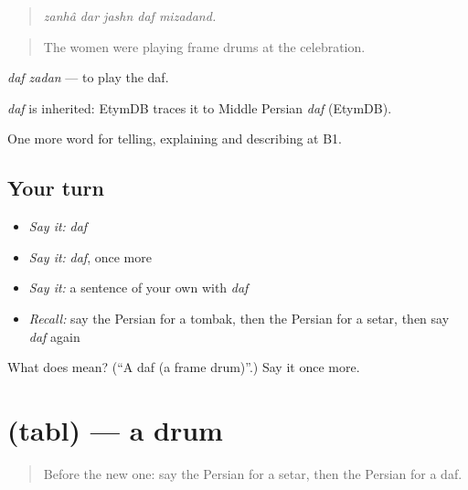 \begin{quote}
\emph{zanhâ dar jashn daf mizadand.}
\end{quote}

\begin{quote}
The women were playing frame drums at the celebration.
\end{quote}

\emph{daf zadan} — to play the daf.

\begin{cousinweb}
\emph{daf} is inherited: EtymDB traces it to Middle Persian \emph{daf} (EtymDB).
\end{cousinweb}

\begin{grammarlens}[title={What you've built}]
One more word for telling, explaining and describing at B1.
\end{grammarlens}

\subsection*{Your turn}
\begin{itemize}
\raggedright
  \item \emph{Say it:} \emph{daf}
  \item \emph{Say it:} \emph{daf}, once more
  \item \emph{Say it:} a sentence of your own with \emph{daf}
  \item \emph{Recall:} say the Persian for a tombak, then the Persian for a setar, then say \emph{daf} again
\end{itemize}

\begin{tcolorbox}[breakable,colback=teal!4,colframe=teal!35!black,title={Before you move on}]
What does  mean? (\textquotedblleft{}A daf (a frame drum)\textquotedblright{}.) Say it once more.
\end{tcolorbox}
\section[\texorpdfstring{\fa{طبل} (tabl)}{طبل (tabl)}]{ (tabl) — a drum}

\label{lesson:FA-C518-tabl}



\begin{quote}
Before the new one: say the Persian for a setar, then the Persian for a daf.
\end{quote}

